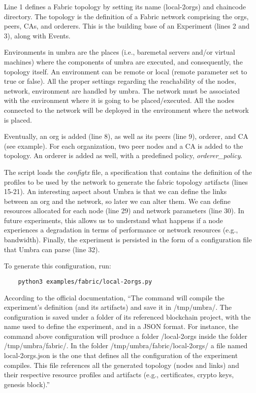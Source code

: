 \documentclass[12pt,a4paper]{article}
\theoremstyle{definition}
\begin{document}
Line 1 defines a Fabric topology by setting its name (local-2orgs) and chaincode directory. The topology is the definition of a Fabric network comprising the orgs, peers, CAs, and orderers. This is the building base of an Experiment (lines 2 and 3), along with Events.

Environments in umbra are the places (i.e., baremetal servers and/or virtual machines) where the components of umbra are executed, and consequently, the topology itself. An environment can be remote or local (remote parameter set to true or false). All the proper settings regarding the reachability of the nodes, network, environment are handled by umbra. The network must be associated with the environment where it is going to be placed/executed. All the nodes connected to the network will be deployed in the environment where the network is placed.
    
Eventually, an org is added (line 8), as well as its peers (line 9), orderer, and CA (see example). For each organization, two peer nodes and a CA is added to the topology. An orderer is added as well, with a predefined policy, \emph{orderer\_policy}.

The script loads the \emph{configtx} file, a specification that contains the definition of the profiles to be used by the network to generate the fabric topology artifacts (lines 15-21). An interesting aspect about Umbra is that we can define the links between an org and the network, so later we can alter them. We can define resources allocated for each node (line 29) and network parameters (line 30). In future experiments, this allows us to understand what happens if a node experiences a degradation in terms of performance or network resources (e.g., bandwidth). Finally, the experiment is persisted in the form of a configuration file that Umbra can parse (line 32).

To generate this configuration, run:

\begin{verbatim}
    python3 examples/fabric/local-2orgs.py

\end{verbatim}
According to the official documentation, ``The command will compile the experiment's definition (and its artifacts) and save it in /tmp/umbra/. The configuration is saved under a folder of its referenced blockchain project, with the name used to define the experiment, and in a JSON format. For instance, the command above configuration will produce a folder /local-2orgs inside the folder /tmp/umbra/fabric/. In the folder /tmp/umbra/fabric/local-2orgs/ a file named local-2orgs.json is the one that defines all the configuration of the experiment compiles. This file references all the generated topology (nodes and links) and their respective resource profiles and artifacts (e.g., certificates, crypto keys, genesis block).''
\end{document}
